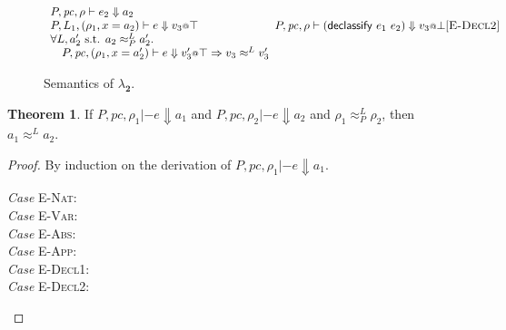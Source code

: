 \documentclass{article}
\makeatletter
\newcommand{\at}{\ensuremath{{\scriptstyle{@}}}}
\newcommand{\pc}{\ensuremath{{\mathit{pc}}}}
\theoremstyle{definition}
\newtheorem{theorem}{Theorem}
\makeatother
\begin{document}
\begin{figure}[h]
\begin{gather*}
{{\begin{array}{l}
          \\
          P, \pc, \rho |- e_2 \Downarrow a_2
          \\
          P, L_1, (\rho_1, x = a_2) |- e \Downarrow v_3 \at \top
          \\
          \forall{L, a_2' \text{ s.t. } a_2 \approx^{L}_{P} a_2'}.\, 
          \\\quad
          P, \pc, (\rho_1, x = a_2') |- e \Downarrow v_3' \at \top =>
          v_3 \approx^{L} v_3'
        \end{array}}
    }{
      P, \pc, \rho |- (\mathsf{declassify}\ e_1\ e_2) \Downarrow v_3 \at \bot
    }[\textsc{E-Decl2}]
  \end{gather*}
  \caption{Semantics of $\lambda_{\mathbf{2}}$.}
  \label{fig:semantics}
\end{figure}

\begin{theorem}
  If $P, \pc, \rho_1 |- e \Downarrow a_1$ and
  $P, \pc, \rho_2 |- e \Downarrow a_2$ and
  $\rho_1 \approx^{L}_{P} \rho_2$, then
  $a_1 \approx^{L} a_2$.
\end{theorem}
\begin{proof}
  By induction on the derivation of $P, \pc, \rho_1 |- e \Downarrow a_1$.
  \begin{description}
  \item[\emph{Case} \textsc{E-Nat}:]
  \item[\emph{Case} \textsc{E-Var}:]
  \item[\emph{Case} \textsc{E-Abs}:]
  \item[\emph{Case} \textsc{E-App}:]
  \item[\emph{Case} \textsc{E-Decl1}:]
  \item[\emph{Case} \textsc{E-Decl2}:]
    \qedhere
  \end{description}
\end{proof}
\end{document}
